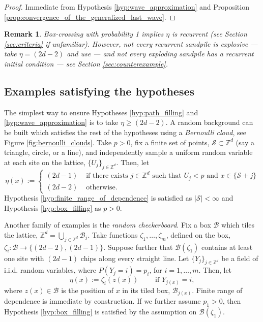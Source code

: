 \documentclass[aap]{imsart}
\newcommand{\Z}{\mathbb{Z}}
\newtheorem{remark}{Remark}
\begin{document}
\begin{proof}
	Immediate from Hypothesis \ref{hyp:wave_approximation} and Proposition \ref{prop:convergence_of_the_generalized_last_wave}.
\end{proof}

\begin{remark} 
	Box-crossing with probability 1 implies $\eta$ is recurrent (see Section \ref{sec:criteria} if unfamiliar).  However, not every 
	recurrent sandpile is explosive  --- take $\eta = (2 d - 2)$ and use \cite{fey2010growth} --- and not every exploding sandpile has a recurrent initial condition ---  see Section \ref{sec:counterexample}. 
\end{remark}



\subsection{Examples satisfying the hypotheses}

The simplest way to ensure Hypotheses \ref{hyp:path_filling} and \ref{hyp:wave_approximation}
is to take $\eta \geq (2 d - 2)$. A random background can be built which satisfies the 
rest of the hypotheses using a {\it Bernoulli cloud}, see Figure \ref{fig:bernoulli_clouds}. Take $p > 0$, fix a finite set of points, $\mathcal{S} \subset \Z^d$ (say a triangle, circle, or a line), and independently sample a uniform random variable at each site on the lattice, $\{U_j\}_{j \in \Z^d}$. 
Then, let 
\begin{equation} \label{eq:bernoulli_cloud}
\eta(x)  :=  
\begin{cases} (2 d- 1)  & \mbox{ if there exists $j \in \Z^d$ such that $U_j < p$ and $x \in \{ \mathcal{S} + j \}$} \\
(2d - 2) & \mbox{ otherwise.}
\end{cases}
\end{equation}
Hypothesis \ref{hyp:finite_range_of_dependence} is satisfied as $|\mathcal{S}| < \infty$
and Hypothesis \ref{hyp:box_filling} as $p > 0$. 

Another family of examples is the {\it random checkerboard}. Fix a box $\mathcal{B}$ which tiles the lattice, $\Z^d = \bigcup_{j \in \Z^d} \mathcal{B}_j$.  Take functions $\zeta_1, \ldots, \zeta_m$, defined on the box,  $\zeta_i: \mathcal{B} \to \{ (2 d - 2), (2 d - 1)\}$. Suppose further that $\mathcal{B}(\zeta_1)$ contains at least one site 
with $(2d-1)$ chips along every straight line.  Let $\{Y_j\}_{j \in \Z^d}$ be a field of i.i.d. random variables, where $P(Y_j = i) = p_i$, for $i = 1, \ldots, m$. 
Then, let 
\begin{equation} \label{eq:random_checkerboard}
\eta(x) := \zeta_i(z(x)) \qquad \mbox{ if $Y_{j(x)} = i$}, 
\end{equation}
where $z(x)  \in \mathcal{B}$ is the position of $x$ in its tiled box, $\mathcal{B}_{j(x)}$. 
Finite range
of dependence is immediate by construction. If we further assume $p_1 > 0$, then Hypothesis \ref{hyp:box_filling} is satisfied by the assumption on $\mathcal{B}(\zeta_1)$. 
\end{document}
